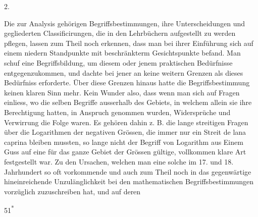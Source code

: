 \begin{center}2.\end{center}
\noindent\hspace*{\parindent}Die zur Analysis gehörigen Begriffsbestimmungen, ihre Unterscheidungen und gegliederten Classificirungen, die in den Lehrbüchern aufgestellt zu werden pflegen, lassen zum Theil noch erkennen, dass man bei ihrer Einführung sich auf einem niedern Standpunkte mit beschränkterm Gesichtspunkte befand. Man schuf eine Begriffsbildung, um diesem oder jenem praktischen Bedürfnisse entgegenzukommen, und dachte bei jener an keine weitern Grenzen als dieses Bedürfniss erforderte. Über diese Grenzen hinaus hatte die Begriffsbestimmung keinen klaren Sinn mehr. Kein Wunder also, dass wenn man sich auf Fragen einliess, wo die selben Begriffe ausserhalb des Gebiets, in welchem allein sie ihre Berechtigung hatten, in Anspruch genommen wurden, Widersprüche und Verwirrung die Folge waren. Es gehören dahin z. B. die lange streitigen Fragen über die Logarithmen der negativen Grössen, die immer nur ein Streit de lana caprina bleiben mussten, so lange nicht der Begriff von Logarithm aus Einem Guss auf eine für das ganze Gebiet der Grössen gültige, vollkommen klare Art festgestellt war. Zu den Ursachen, welchen man eine solche im 17. und 18. Jahrhundert so oft vorkommende und auch zum Theil noch in das gegenwärtige hineinreichende Unzulänglichkeit bei den mathematischen Begriffsbestimmungen vorzüglich zuzuschreiben hat, und auf deren
\par\vfill\hfill{\small 51\textsuperscript{*}}\par
\clearpage{}
